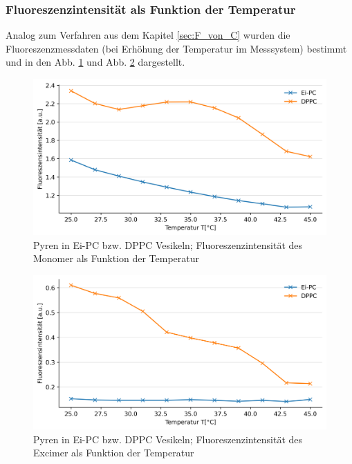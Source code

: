 \subsubsection{Fluoreszenzintensität als Funktion der Temperatur} \label{sec:FvonT}

Analog zum Verfahren aus dem Kapitel \ref{sec:F_von_C} wurden die Fluoreszenzmessdaten (bei Erhöhung der Temperatur im Messsystem) bestimmt und in den Abb. \ref{Monomer_Temp} und Abb. \ref{Excimer_Temp} dargestellt.

\begin{figure}[h!]
	\begin{center}
		\begin{minipage}{0,8\textwidth}
			
			\includegraphics[width=\textwidth]{picture/Monomer_Temp.png}
			\caption{Pyren in Ei-PC bzw. DPPC Vesikeln; Fluoreszenzintensität des Monomer als Funktion der Temperatur} 
			\label{Monomer_Temp} 
		\end{minipage}
	\end{center}
\end{figure}

\begin{figure}[h!]
	\begin{center}
		\begin{minipage}{0,8\textwidth}
			
			\includegraphics[width=\textwidth]{picture/Excimer_Temp.png}
			\caption{Pyren in Ei-PC bzw. DPPC Vesikeln; Fluoreszenzintensität des Excimer als Funktion der Temperatur} 
			\label{Excimer_Temp} 
		\end{minipage}
	\end{center}
\end{figure}

